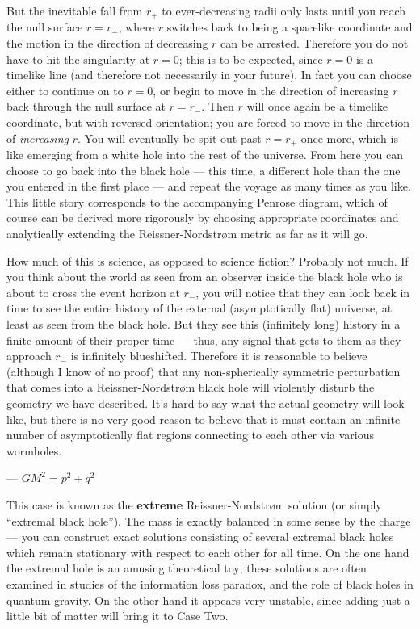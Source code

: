 But the inevitable fall from $r_+$ to ever-decreasing radii only
lasts until you reach the null surface $r=r_-$, where $r$
switches back to being a spacelike coordinate and the motion in
the direction of decreasing $r$ can be arrested.  Therefore you
do not have to hit the singularity at $r=0$; this is to be expected,
since $r=0$ is a timelike line (and therefore not necessarily in your
future).  In fact you can choose either to continue on to $r=0$, or
begin to move in the direction of increasing $r$ back through the
null surface at $r=r_-$.  Then $r$ will once again be a timelike 
coordinate, but with reversed orientation; you are forced to move
in the direction of {\it increasing} $r$.  You will eventually be
spit out past $r=r_+$ once more, which is like emerging from a
white hole into the rest of the universe.  From here you can choose
to go back into the black hole --- this time, a different hole than
the one you entered in the first place --- and repeat the voyage
as many times as you like.  This little story corresponds to the
accompanying Penrose diagram, which of course can be derived more
rigorously by choosing appropriate coordinates and analytically
extending the Reissner-Nordstr{\o}m metric as far as it will go.

How much of this is science, as opposed to science fiction?
Probably not much.  If you think about the world as seen from
an observer inside the black hole who is about to cross the event
horizon at $r_-$, you will notice that they can look back in time
to see the entire history of the external (asymptotically flat)
universe, at least as seen from the black hole.  But they see this
(infinitely long) history in a finite amount of their proper time ---
thus, any  signal that gets to them as they approach $r_-$ is
infinitely blueshifted.  Therefore it is reasonable to believe
(although I know of no proof) that any non-spherically symmetric
perturbation that comes into a Reissner-Nordstr{\o}m black hole
will violently disturb the geometry we have described.  It's hard to 
say what the actual geometry will look like, but there is no very
good reason to believe that it must contain an infinite number of
asymptotically flat regions connecting to each other via
various wormholes.

 --- $GM^2=p^2+q^2$

This case is known as the {\bf extreme} Reissner-Nordstr{\o}m
solution (or simply ``extremal black hole'').  
The mass is exactly balanced in some sense by the charge ---
you can construct exact solutions consisting of several extremal
black holes which remain stationary with respect to each other
for all time.  On the one hand the extremal hole is an amusing theoretical 
toy; these solutions are often examined in studies of the information
loss paradox, and the role of black holes in quantum gravity.
On the other hand it appears very unstable, since adding just a
little bit of matter will bring it to Case Two.

